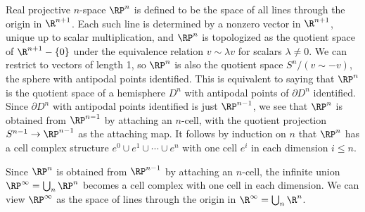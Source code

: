 \begin{example}
\label{ex:real-projective-space-cw}
Real projective $n$-space $\RP^n$ is defined to be the space of all lines through the
origin in $\R^{n+1}$. Each such line is determined by a nonzero vector in $\R^{n+1}$, unique
up to scalar multiplication, and $\RP^n$ is topologized as the quotient space of
$\R^{n+1} - \{0\}$ under the equivalence relation $v \sim \lambda v$ for scalars $\lambda \ne 0$. We can
restrict to vectors of length 1, so $\RP^n$ is also the quotient space $S^n / (v \sim -v)$, the
sphere with antipodal points identified. This is equivalent to saying that $\RP^n$ is the
quotient space of a hemisphere $D^n$ with antipodal points of $\partial D^n$ identified. Since
$\partial D^n$ with antipodal points identified is just $\RP^{n-1}$, we see that $\RP^n$ is obtained
from $\RP^{n-1}$ by attaching an $n$-cell, with the quotient projection $S^{n-1} \to \RP^{n-1}$ as
the attaching map. It follows by induction on $n$ that $\RP^n$ has a cell complex structure
$e^0 \cup e^1 \cup \cdots \cup e^n$ with one cell $e^i$ in each dimension $i \le n$.
\end{example}

\begin{example}
\label{ex:infinite-real-projective-space}
Since $\RP^n$ is obtained from $\RP^{n-1}$ by attaching an $n$-cell, the infinite union
$\RP^\infty = \bigcup_n \RP^n$ becomes a cell complex with one cell in each dimension. We can
view $\RP^\infty$ as the space of lines through the origin in $\R^\infty = \bigcup_n \R^n$.
\end{example}

